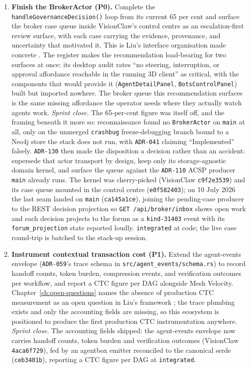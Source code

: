 \begin{enumerate}
  \item \textbf{Finish the BrokerActor (P0).} Complete the \texttt{handleGovernanceDecision()} loop from its current 65 per cent and surface the broker case queue inside VisionClaw's control centre as an escalation-first review surface, with each case carrying the evidence, provenance, and uncertainty that motivated it. This is Liu's interface organisation made concrete \parencite{Liu2026}. The register makes the recommendation load-bearing for two surfaces at once: its desktop audit rates ``no steering, interruption, or approval affordance reachable in the running 3D client'' as critical, with the components that would provide it (\texttt{AgentDetailPanel}, \texttt{BotsControlPanel}) built but imported nowhere. The broker queue this recommendation surfaces is the same missing affordance the operator needs where they actually watch agents work. \emph{Sprint close.} The 65-per-cent figure was itself off, and the framing beneath it more so: reconnaissance found no \texttt{BrokerActor} on \texttt{main} at all, only on the unmerged \texttt{crashbug} freeze-debugging branch bound to a Neo4j store the stack does not run, with \texttt{ADR-041} claiming ``Implemented'' falsely. \texttt{ADR-130} then made the disposition a decision rather than an accident: supersede that actor transport by design, keep only its storage-agnostic domain kernel, and surface the queue against the \texttt{ADR-110} ACSP producer \texttt{main} already runs. The kernel was cherry-picked (VisionClaw \texttt{c9f2e3539}) and its case queue mounted in the control centre (\texttt{e0f582403}); on 10 July 2026 the last seam landed on \texttt{main} (\texttt{ca145a1ce}), joining the pending-case producer to the REST decision projection so \texttt{GET /api/broker/inbox} shows open work and each decision projects to the forum as a \texttt{kind-31403} event with its \texttt{forum\_projection} state reported loudly. \texttt{integrated} at code; the live case round-trip is batched to the stack-up session.

  \item \textbf{Instrument contextual transaction cost (P1).} Extend the agent-events envelope (\texttt{ADR-059}'s trace schema in \texttt{src/agent\_events/schema.rs}) to record handoff counts, token burden, compression events, and verification outcomes per workflow, and report a CTC figure per DAG alongside Mesh Velocity. Chapter~\ref{ch:open-questions} names the absence of production CTC measurement as an open question in Liu's framework \parencite{Liu2026}; the trace plumbing exists and only the accounting fields are missing, so this ecosystem is positioned to produce the first production CTC instrumentation anywhere. \emph{Sprint close.} The accounting fields shipped: the agent-events envelope now carries handoff counts, token burden and verification outcomes (VisionClaw \texttt{4aca6f729}), fed by an agentbox emitter reconciled to the canonical serde (\texttt{ceb3401b}), reporting a CTC figure per DAG at \texttt{integrated}.


\end{enumerate}
